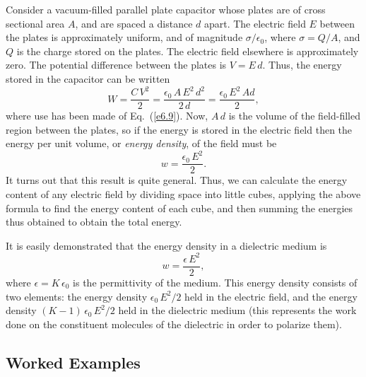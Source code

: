Consider a vacuum-filled parallel plate capacitor whose plates are of cross sectional area $A$,
and are spaced a distance $d$ apart. The electric field $E$ between the plates
is
approximately uniform, and of magnitude $\sigma/\epsilon_0$, where $\sigma
=Q/A$, and $Q$ is the charge stored on the plates. The electric field elsewhere is approximately zero. The potential difference
between the plates is $V=E\,d$. Thus, the energy stored in the capacitor
can be written
\begin{equation}
W = \frac{C\,V^2}{2} = \frac{\epsilon_0\,A\,E^2\,d^2}{2\,d} =
\frac{\epsilon_0\,E^2\,Ad}{2},
\end{equation}
where use has been made of Eq.~(\ref{e6.9}).
Now, $A\,d$ is the volume of the field-filled region between the plates, so if the
energy is stored in the electric field then the energy per unit volume,
 or  {\em energy density}, of the field must be
\begin{equation}\label{e6.23}
w = \frac{\epsilon_0\,E^2}{2}.
\end{equation}
It turns out that this result is quite general. Thus, we can calculate the energy
content of any electric field by dividing  space into little cubes, applying the
above formula to find the energy content of each cube, and then summing the
energies thus obtained to obtain the total energy. 

It is easily demonstrated that the energy density in a dielectric
medium is
\begin{equation}
w = \frac{\epsilon\, E^2}{2},
\end{equation}
where $\epsilon=K\,\epsilon_0$ is the permittivity of the medium. 
This energy density consists of two elements: the energy density $\epsilon_0\,E^2/2$
held in the electric field, and the energy density $(K-1)\,\epsilon_0\,E^2/2$
held in the dielectric medium (this represents the work done on the
constituent  molecules of the dielectric 
in order to polarize them). 

\subsection{Worked Examples}
